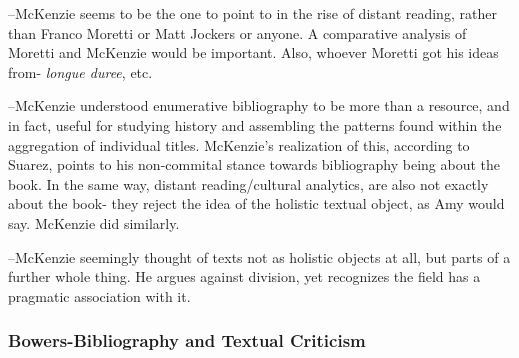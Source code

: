 \documentclass[course, english]{Notes}
\newcommand{\n}{\scalebox{2}{\textbf{\framebox{$\aleph$} } } }
\begin{document}
\n --McKenzie seems to be the one to point to in the rise of distant reading, rather than Franco Moretti or Matt Jockers or anyone. A comparative analysis of Moretti and McKenzie would be important. Also, whoever Moretti got his ideas from- \emph{longue duree}, etc. 

\n --McKenzie understood enumerative bibliography to be more than a resource, and in fact, useful for studying history and assembling the patterns found within the aggregation of individual titles. McKenzie's realization of this, according to Suarez, points to his non-commital stance towards bibliography being about the book. In the same way, distant reading/cultural analytics, are also not exactly about the book- they reject the idea of the holistic textual object, as Amy would say. McKenzie did similarly.

\n --McKenzie seemingly thought of texts not as holistic objects at all, but parts of a further whole thing. He argues against division, yet recognizes the field has a pragmatic association with it. 



\subsubsection{Bowers-Bibliography and Textual Criticism}
\end{document}

